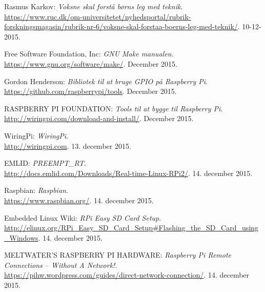 \begin{thebibliography}{2}
 Rasmus Karkov: \textit{Voksne skal forstå børns leg med teknik}. \\
\url{https://www.ruc.dk/om-universitetet/nyhedsportal/rubrik-forskningsmagasin/rubrik-nr-6/voksne-skal-forstaa-boerns-leg-med-teknik/}. 10-12-2015.

 Free Software Foundation, Inc: \textit{GNU Make manualen}. \\
\url{https://www.gnu.org/software/make/}. December 2015.

 Gordon Henderson: \textit{Bibliotek til at bruge GPIO på Raspberry Pi}. \\
\url{https://github.com/raspberrypi/tools}. December 2015.

 RASPBERRY PI FOUNDATION: \textit{Tools til at bygge til Raspberry Pi}. \\
\url{http://wiringpi.com/download-and-install/}. December 2015.

 WiringPi: \textit{WiringPi}. \\
\url{http://wiringpi.com}. 13. december 2015.

 EMLID: \textit{PREEMPT\_RT}. \\
\url{http://docs.emlid.com/Downloads/Real-time-Linux-RPi2/}. 14. december 2015.

 Raspbian: \textit{Raspbian}. \\
\url{https://www.raspbian.org/}. 14. december 2015.

 Embedded Linux Wiki: \textit{RPi Easy SD Card Setup}. \\
\url{http://elinux.org/RPi_Easy_SD_Card_Setup#Flashing_the_SD_Card_using_Windows}. 14. december 2015.

 MELTWATER'S RASPBERRY PI HARDWARE: \textit{Raspberry Pi Remote Connections – Without A Network!}. \\
\url{https://pihw.wordpress.com/guides/direct-network-connection/}. 14. december 2015.

\end{thebibliography}